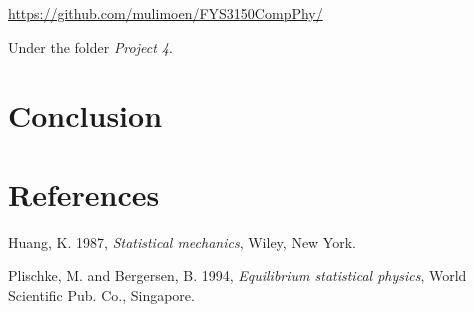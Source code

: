 \documentclass[11pt,a4paper,english]{article}
\numberwithin{equation}{section}
\begin{document}
\url{https://github.com/mulimoen/FYS3150CompPhy/}

Under the folder \emph{Project 4}.

\section{Conclusion}

\section{References}
Huang, K. 1987, \emph{Statistical mechanics}, Wiley, New York. 

Plischke, M. and Bergersen, B. 1994, \emph{Equilibrium statistical physics}, World Scientific Pub. Co., Singapore.
\end{document}
